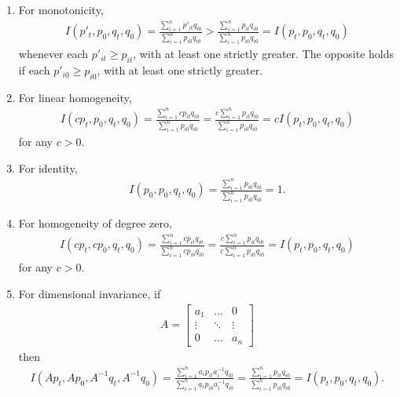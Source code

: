 \documentclass[
]{article}
\begin{document}
\begin{enumerate}
\def\labelenumi{\arabic{enumi}.}
\item
  For monotonicity,
  \begin{align*}
  I(p'_{t}, p_{0}, q_{t}, q_{0}) =  \frac{\sum_{i=1}^{n} p'_{it}q_{i0}}{\sum_{i=1}^{n} p_{i0}q_{i0}} > \frac{\sum_{i=1}^{n} p_{it}q_{i0}}{\sum_{i=1}^{n} p_{i0}q_{i0}} = I(p_{t}, p_{0}, q_{t}, q_{0}) 
   \end{align*}
  whenever each \(p'_{it} \geq p_{it}\), with at least one strictly greater. The opposite holds if each \(p'_{i0} \geq p_{i0}\), with at least one strictly greater.
\item
  For linear homogeneity,
  \begin{align*}
  I(cp_{t}, p_{0}, q_{t}, q_{0}) =  \frac{\sum_{i=1}^{n} cp_{it}q_{i0}}{\sum_{i=1}^{n} p_{i0}q_{i0}} = \frac{c\sum_{i=1}^{n} p_{it}q_{i0}}{\sum_{i=1}^{n} p_{i0}q_{i0}} = cI(p_{t}, p_{0}, q_{t}, q_{0}) 
   \end{align*}
  for any \(c > 0\).
\item
  For identity,
  \begin{align*}
  I(p_{0}, p_{0}, q_{t}, q_{0}) =  \frac{\sum_{i=1}^{n} p_{i0}q_{i0}}{\sum_{i=1}^{n} p_{i0}q_{i0}} = 1.
   \end{align*}
\item
  For homogeneity of degree zero,
  \begin{align*}
  I(cp_{t}, cp_{0}, q_{t}, q_{0}) =  \frac{\sum_{i=1}^{n} cp_{it}q_{i0}}{\sum_{i=1}^{n} cp_{i0}q_{i0}} = \frac{c\sum_{i=1}^{n} p_{it}q_{i0}}{c\sum_{i=1}^{n} p_{i0}q_{i0}} = I(p_{t}, p_{0}, q_{t}, q_{0}) 
   \end{align*}
  for any \(c > 0\).
\item
  For dimensional invariance, if
  \begin{align*}
  A = 
  \begin{bmatrix}
  a_1 & \ldots & 0 \\
  \vdots & \ddots & \vdots \\
  0 & \ldots & a_n
  \end{bmatrix}
   \end{align*}
  then
  \begin{align*}
  I(Ap_{t}, Ap_{0}, A^{-1}q_{t}, A^{-1}q_{0}) = \frac{\sum_{i=1}^{n} a_{i}p_{it}a_{i}^{-1}q_{i0}}{\sum_{i=1}^{n} a_{i}p_{i0}a_{i}^{-1}q_{i0}} = \frac{\sum_{i=1}^{n} p_{it}q_{i0}}{\sum_{i=1}^{n} p_{i0}q_{i0}} = I(p_{t}, p_{0}, q_{t}, q_{0}). 
   \end{align*}
\end{enumerate}
\end{document}

